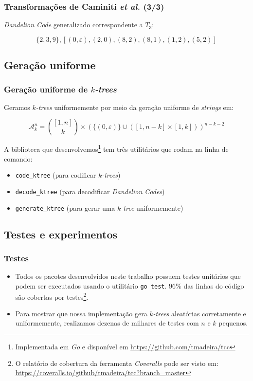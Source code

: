 \documentclass{beamer}
\begin{document}
  \begin{frame}
    \frametitle{Transformações de Caminiti \emph{et al.} (3/3)}

    \emph{Dandelion Code} generalizado correspondente a $T_3$:

    $$
    \{2,3,9\},
    [(0, \varepsilon), (2, 0), (8, 2), (8, 1), (1, 2), (5, 2)]
    $$
  \end{frame}

  \subsection{Geração uniforme}

  \begin{frame}
    \frametitle{Geração uniforme de \emph{$k$-trees}}

    Geramos \emph{$k$-trees} uniformemente por meio da geração uniforme de \emph{strings} em:

    $$
    \mathcal{A}^n_k = { [1,n] \choose k } \times (\{ ( 0, \varepsilon ) \} \cup ([1,n-k] \times [1,k]))^{n-k-2}
    $$

    A biblioteca que desenvolvemos\footnote{\scriptsize Implementada em \emph{Go} e disponível em \url{https://github.com/tmadeira/tcc}} tem três utilitários que rodam na linha de comando:

    {\footnotesize
      \begin{itemize}
        \item {\tt code\_ktree} (para codificar \emph{$k$-trees})
        \item {\tt decode\_ktree} (para decodificar \emph{Dandelion Codes})
        \item {\tt generate\_ktree} (para gerar uma \emph{$k$-tree} uniformemente)
      \end{itemize}
    }
  \end{frame}

  \subsection{Testes e experimentos}

  \begin{frame}
    \frametitle{Testes}

    \begin{itemize}
      \item Todos os pacotes desenvolvidos neste trabalho possuem testes unitários que podem ser executados usando o utilitário {\tt go test}. 96\% das linhas do código são cobertas por testes\footnote{\scriptsize O relatório de cobertura da ferramenta \emph{Coveralls} pode ser visto em: \url{https://coveralls.io/github/tmadeira/tcc?branch=master}}.
      \item Para mostrar que nossa implementação gera \emph{$k$-trees} aleatórias corretamente e uniformemente, realizamos dezenas de milhares de testes com $n$ e $k$ pequenos.
    \end{itemize}
  \end{frame}
\end{document}

